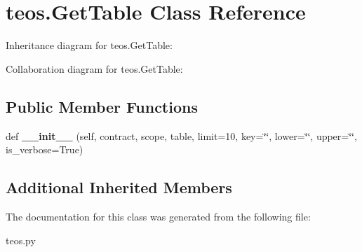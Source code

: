 \hypertarget{classteos_1_1GetTable}{}\section{teos.\+Get\+Table Class Reference}
\label{classteos_1_1GetTable}


Inheritance diagram for teos.\+Get\+Table\+:


Collaboration diagram for teos.\+Get\+Table\+:
\subsection*{Public Member Functions}
\begin{DoxyCompactItemize}
\item 
\mbox{\label{classteos_1_1GetTable_a8678062901af86be7cf6fa9af8264919}} 
def {\bfseries \+\_\+\+\_\+init\+\_\+\+\_\+} (self, contract, scope, table, limit=10, key=\char`\"{}\char`\"{}, lower=\char`\"{}\char`\"{}, upper=\char`\"{}\char`\"{}, is\+\_\+verbose=True)
\end{DoxyCompactItemize}
\subsection*{Additional Inherited Members}


The documentation for this class was generated from the following file\+:\begin{DoxyCompactItemize}
\item 
teos.\+py\end{DoxyCompactItemize}
